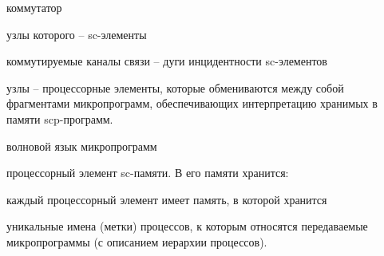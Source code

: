 \begin{textitemize}
	\item коммутатор
	\begin{textitemize}
		\item узлы которого -- sc-элементы
		\item коммутируемые каналы связи -- дуги инцидентности sc-элементов
		\item узлы -- процессорные элементы, которые обмениваются между собой фрагментами микропрограмм, обеспечивающих интерпретацию хранимых в памяти scp-программ.
		\item волновой язык микропрограмм
	\end{textitemize}
	\item процессорный элемент sc-памяти. В его памяти хранится:
\end{textitemize}

	\item каждый процессорный элемент имеет память, в которой хранится
		\begin{textitemize}
		\item уникальные имена (метки) процессов, к которым относятся передаваемые микропрограммы (с описанием иерархии процессов).
	\end{textitemize}
	
